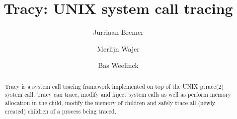 \documentclass[a4paper, 10pt]{report}
\author{Jurriaan Bremer \and Merlijn Wajer \and Bas Weelinck}
\title{Tracy: UNIX system call tracing}
\begin{document}
\maketitle

\nocite{*}


\begin{abstract}
    Tracy is a system call tracing framework implemented on top of the UNIX
    ptrace(2) system call.
    Tracy can trace, modify and inject system calls as well as perform memory
    allocation in the child, modify the memory of children and safely trace
    all (newly created) children of a process being traced.
\end{abstract}

\tableofcontents

%
%
%





%
\end{document}
